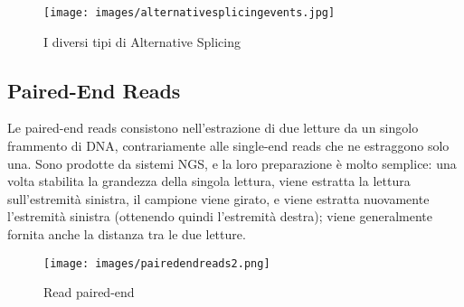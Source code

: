 \begin{figure}[t!]
	\centering
	\texttt{[image: images/alternativesplicingevents.jpg]}
  \caption{I diversi tipi di Alternative Splicing}
  \label{fig:AlternativeSplicingTypes}
\end{figure}

\subsection{Paired-End Reads}
Le paired-end reads consistono nell'estrazione di due letture da un singolo frammento di DNA, contrariamente alle single-end reads che ne estraggono solo una. Sono prodotte da sistemi NGS, e la loro preparazione è molto semplice: una volta stabilita la grandezza della singola lettura, viene estratta la lettura sull'estremità sinistra, il campione viene girato, e viene estratta nuovamente l'estremità sinistra (ottenendo quindi l'estremità destra); viene generalmente fornita anche la distanza tra le due letture.

\begin{figure}[h!]
	\centering
	\texttt{[image: images/pairedendreads2.png]}
  \caption{Read paired-end}
  \label{fig:PairedEndReads}
\end{figure}